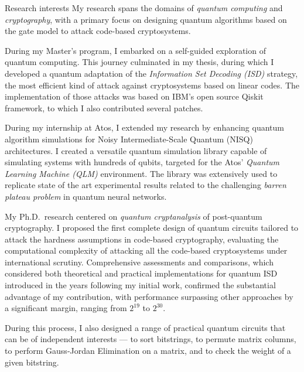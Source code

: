 \documentclass[
	a4paper, %
	11pt, %
]{tresume} %
\begin{document}
\begin{tSection}{Research interests}
  My research spans the domains of \emph{quantum computing} and
  \emph{cryptography}, with a primary focus on designing quantum algorithms
  based on the gate model to attack code-based cryptosystems.

  During my Master's program, I embarked on a self-guided exploration of quantum
  computing. This journey culminated in my thesis, during which I developed a
  quantum adaptation of the \emph{Information Set Decoding (ISD)} strategy, the
  most efficient kind of attack against cryptosystems based on linear codes. The
  implementation of those attacks was based on IBM's open source Qiskit
  framework, to which I also contributed several patches.

  During my internship at Atos, I extended my research by enhancing quantum
  algorithm simulations for Noisy Intermediate-Scale Quantum (NISQ)
  architectures. I created a versatile quantum simulation library capable of
  simulating systems with hundreds of qubits, targeted for the Atos'
  \emph{Quantum Learning Machine (QLM)} environment. The library was extensively
  used to replicate state of the art experimental results related to the
  challenging \emph{barren plateau problem} in quantum neural networks.

  My Ph.D.\ research centered on \emph{quantum cryptanalysis} of post-quantum
  cryptography. I proposed the first complete design of quantum circuits
  tailored to attack the hardness assumptions in code-based cryptography,
  evaluating the computational complexity of attacking all the code-based
  cryptosystems under international scrutiny.
  Comprehensive assessments and comparisons, which considered both theoretical
  and practical implementations for quantum ISD introduced in the years
  following my initial work, confirmed the substantial advantage of my
  contribution, with performance surpassing other approaches by a significant
  margin, ranging from $2^{19}$ to $2^{30}$.

  During this process, I also designed a range of practical quantum circuits
  that can be of independent interests --- to sort bitstrings, to permute matrix
  columns, to perform Gauss-Jordan Elimination on a matrix, and to check the
  weight of a given bitstring.

\end{tSection}
\clearpage
\end{document}
